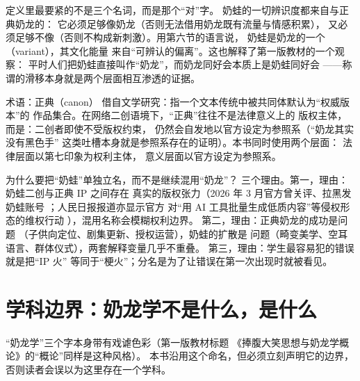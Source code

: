 定义里最要紧的不是三个名词，而是那个“对”字。
奶蛙的一切辨识度都来自与正典奶龙的：
它必须足够像奶龙（否则无法借用奶龙既有流量与情感积累），
又必须足够不像（否则不构成新刺激）。用第六节的语言说，
奶蛙是奶龙的一个（variant），其文化能量
来自“可辨认的偏离”。这也解释了第一版教材的一个观察：
平时人们把奶蛙直接叫作“奶龙”，而奶龙同好会本质上是奶蛙同好会
——称谓的滑移本身就是两个层面相互渗透的证据。

\begin{nltermbox}{术语：正典（canon）}
  借自文学研究：指一个文本传统中被共同体默认为“权威版本”的
  作品集合。在网络二创语境下，“正典”往往不是法律意义上的
  版权主体，而是：二创者即使不受版权约束，
  仍然会自发地以官方设定为参照系（“奶龙其实没有黑色手”
  这类吐槽本身就是参照系存在的证明）。本书同时使用两个层面：
  法律层面以第七印象为权利主体\cite{jiang2026nailong}，
  意义层面以官方设定为参照系。
\end{nltermbox}

为什么要把“奶蛙”单独立名，而不是继续混用“奶龙”？
三个理由。第一，理由：奶蛙二创与正典 IP 之间存在
真实的版权张力（2026 年 3 月官方曾关评、拉黑发奶蛙账号
\cite{shoutanji2026naiwa}；人民日报报道亦显示官方
对“用 AI 工具批量生成低质内容”等侵权形态的维权行动
\cite{jiang2026nailong}），混用名称会模糊权利边界。
第二，理由：正典奶龙的成功是问题
（子供向定位、剧集更新、授权运营），奶蛙的扩散是
问题（畸变美学、空耳语言、群体仪式），两套解释变量几乎不重叠。
第三，理由：学生最容易犯的错误就是把“IP 火”
等同于“梗火”；分名是为了让错误在第一次出现时就被看见。

\section{学科边界：奶龙学不是什么，是什么}\label{sec:02:boundary}

“奶龙学”三个字本身带有戏谑色彩（第一版教材标题
《捧腹大笑思想与奶龙学概论》的“概论”同样是这种风格）。
本书沿用这个命名，但必须立刻声明它的边界，
否则读者会误以为这里存在一个学科。

